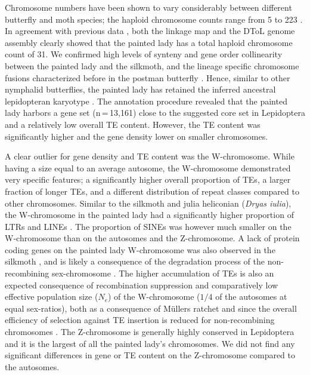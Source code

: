 \documentclass[twocolumn]{bmcart}%
\begin{document}
Chromosome numbers have been shown to vary considerably between different butterfly and moth species; the haploid chromosome counts range from 5 to 223 \citep{lukhtanovBlueButterflyPolyommatus2015, devosSpeciationChromosomalFusion2020}. In agreement with previous data \citep{zhangHighQualityGenomeAssembly2021}, both the linkage map and the DToL genome assembly clearly showed that the painted lady has a total haploid chromosome count of 31. We confirmed high levels of synteny and gene order collinearity between the painted lady and the silkmoth, and the lineage specific chromosome fusions characterized before in the postman butterfly \citep{daveyNoEvidenceMaintenance2017}. Hence, similar to other nymphalid butterflies, the painted lady has retained the inferred ancestral lepidopteran karyotype \citep{aholaGlanvilleFritillaryGenome2014}. The annotation procedure revealed that the painted lady harbors a gene set (n\,=\,13,161) close to the suggested core set in Lepidoptera \citep{challiLepbaseLepidopteranGenome2016, liInsectGenomesProgress2019} and a relatively low overall TE content. However, the TE content was significantly higher and the gene density lower on smaller chromosomes. 

A clear outlier for gene density and TE content was the W-chromosome. While having a size equal to an average autosome, the W-chromosome demonstrated very specific features; a significantly higher overall proportion of TEs, a larger fraction of longer TEs, and a different distribution of repeat classes compared to other chromosomes. Similar to the silkmoth and julia heliconian (\textit{Dryas iulia}), the W-chromosome in the painted lady had a significantly higher proportion of LTRs and LINEs \citep{lewisDryasIuliaGenome2021, mitaGenomeSequenceSilkworm2004}. The proportion of SINEs was however much smaller on the W-chromosome than on the autosomes and the Z-chromosome. A lack of protein coding genes on the painted lady W-chromosome was also observed in the silkmoth \citep{abeIdentificationFemaledeterminingRegion2008,mitaGenomeSequenceSilkworm2004}, and is likely a consequence of the degradation process of the non-recombining sex-chromosome \citep{bachtrogChromosomeEvolutionEmerging2013}. The higher accumulation of TEs is also an expected consequence of recombination suppression and comparatively low effective population size ($N_e$) of the W-chromosome ($1/4$ of the autosomes at equal sex-ratios), both as a consequence of Müllers ratchet and since the overall efficiency of selection against TE insertion is reduced for non-recombining chromosomes \citep{bachtrogChromosomeEvolutionEmerging2013}. The Z-chromosome is generally highly conserved in Lepidoptera \citep{fraisseDeepConservationLepidoptera2017} and it is the largest of all the painted lady’s chromosomes. We did not find any significant differences in gene or TE content on the Z-chromosome compared to the autosomes.
\end{document}
